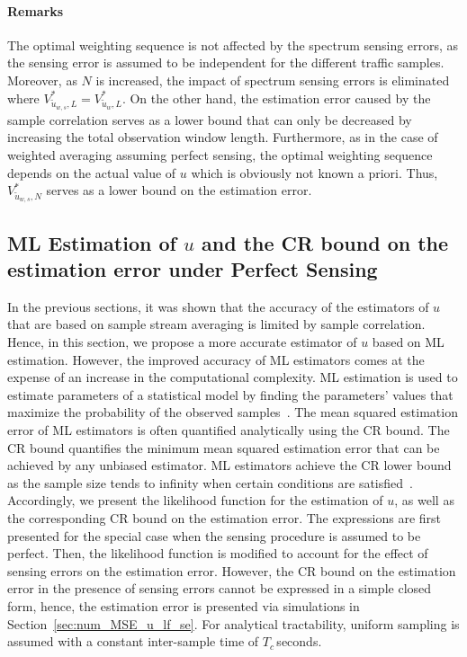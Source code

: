 \documentclass[11pt,draftclsnofoot,journal,onecolumn]{IEEEtran}
\begin{document}
\paragraph*{Remarks}

The optimal weighting sequence is not affected by the spectrum sensing errors, as the sensing error is assumed to be independent for the different traffic samples. Moreover, as $N$ is increased, the impact of spectrum sensing errors is eliminated where $V_{\tilde{u}_{w,s},L}^* = V_{\tilde{u}_{w},L}^*$. On the other hand, the estimation error caused by the sample correlation serves as a lower bound that can only be decreased by increasing the total observation window length. Furthermore, as in the case of weighted averaging assuming perfect sensing, the optimal weighting sequence depends on the actual value of $u$ which is obviously not known a priori. Thus, $V_{\tilde{u}_{w,s},N}^*$ serves as a lower bound on the estimation error.

\subsection{ML Estimation of $u$ and the CR bound on the estimation error under Perfect Sensing}
\label{sec:ml_u}

In the previous sections, it was shown that the accuracy of the estimators of $u$ that are based on sample stream averaging is limited by sample correlation. Hence, in this section, we propose a more accurate estimator of $u$ based on ML estimation. However, the improved accuracy of ML estimators comes at the expense of an increase in the computational complexity. ML estimation is used to estimate parameters of a statistical model by finding the parameters' values that maximize the probability of the observed samples~\cite{raol_book_2004}. The mean squared estimation error of ML estimators is often quantified analytically using the CR bound. The CR bound quantifies the minimum mean squared estimation error that can be achieved by any unbiased estimator. ML estimators achieve the CR lower bound as the sample size tends to infinity when certain conditions are satisfied~\cite[Ch. 12]{ML_ref}. Accordingly, we present the likelihood function for the estimation of $u$, as well as the corresponding CR bound on the estimation error. The expressions are first presented for the special case when the sensing procedure is assumed to be perfect. Then, the likelihood function is modified to account for the effect of sensing errors on the estimation error. However, the CR bound on the estimation error in the presence of sensing errors cannot be expressed in a simple closed form, hence, the estimation error is presented via simulations in Section~\ref{sec:num_MSE_u_lf_se}. For analytical tractability, uniform sampling is assumed with a constant inter-sample time of $T_c$\,seconds.
\end{document}
